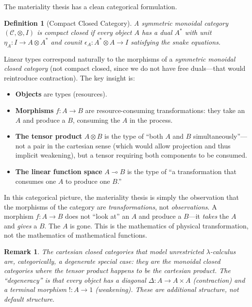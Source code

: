 \documentclass[11pt,a4paper]{article}
\newtheorem{definition}[theorem]{Definition}
\newtheorem{remark}[theorem]{Remark}
\newcommand{\tensor}{\otimes}
\newcommand{\lolli}{\multimap}
\begin{document}
The materiality thesis has a clean categorical formulation.

\begin{definition}[Compact Closed Category]
A symmetric monoidal category $(\mathcal{C}, \tensor, I)$ is
\emph{compact closed} if every object $A$ has a dual $A^*$ with
unit $\eta_A : I \to A \tensor A^*$ and counit $\epsilon_A :
A^* \tensor A \to I$ satisfying the snake equations.
\end{definition}

Linear types correspond naturally to the morphisms of a
\emph{symmetric monoidal closed category} (not compact closed,
since we do not have free duals---that would reintroduce
contraction). The key insight is:

\begin{itemize}
\item \textbf{Objects} are types (resources).
\item \textbf{Morphisms} $f : A \to B$ are resource-consuming
  transformations: they take an $A$ and produce a $B$, consuming
  the $A$ in the process.
\item \textbf{The tensor product} $A \tensor B$ is the type of
  ``both $A$ and $B$ simultaneously''---not a pair in the
  cartesian sense (which would allow projection and thus implicit
  weakening), but a tensor requiring both components to be consumed.
\item \textbf{The linear function space} $A \lolli B$ is the type
  of ``a transformation that consumes one $A$ to produce one $B$.''
\end{itemize}

In this categorical picture, the materiality thesis is simply the
observation that the morphisms of the category are
\emph{transformations}, not \emph{observations}. A morphism
$f : A \to B$ does not ``look at'' an $A$ and produce a $B$---it
\emph{takes} the $A$ and \emph{gives} a $B$. The $A$ is gone. This
is the mathematics of physical transformation, not the mathematics
of mathematical functions.

\begin{remark}
The cartesian closed categories that model unrestricted
$\lambda$-calculus are, categorically, a degenerate special case:
they are the monoidal closed categories where the tensor product
happens to be the cartesian product. The ``degeneracy'' is that
every object has a diagonal $\Delta : A \to A \times A$ (contraction)
and a terminal morphism $! : A \to 1$ (weakening). These are
\emph{additional structure}, not default structure.
\end{remark}
\end{document}
